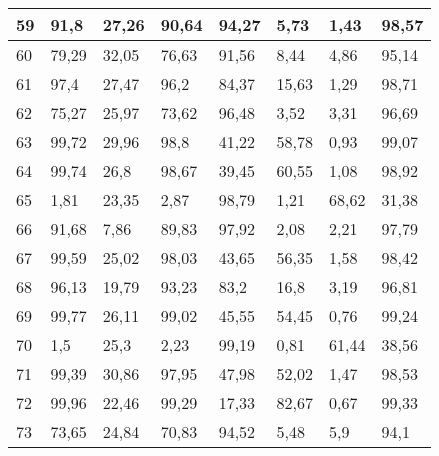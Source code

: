 \begin{longtable}[c]{|l|l|l|l|l|l|l|l|}
59              & 91,8         & 27,26        & 90,64       & 94,27         & 5,73          & 1,43          & 98,57         \\ \hline
60              & 79,29        & 32,05        & 76,63       & 91,56         & 8,44          & 4,86          & 95,14         \\ \hline
61              & 97,4         & 27,47        & 96,2        & 84,37         & 15,63         & 1,29          & 98,71         \\ \hline
62              & 75,27        & 25,97        & 73,62       & 96,48         & 3,52          & 3,31          & 96,69         \\ \hline
63              & 99,72        & 29,96        & 98,8        & 41,22         & 58,78         & 0,93          & 99,07         \\ \hline
64              & 99,74        & 26,8         & 98,67       & 39,45         & 60,55         & 1,08          & 98,92         \\ \hline
65              & 1,81         & 23,35        & 2,87        & 98,79         & 1,21          & 68,62         & 31,38         \\ \hline
66              & 91,68        & 7,86         & 89,83       & 97,92         & 2,08          & 2,21          & 97,79         \\ \hline
67              & 99,59        & 25,02        & 98,03       & 43,65         & 56,35         & 1,58          & 98,42         \\ \hline
68              & 96,13        & 19,79        & 93,23       & 83,2          & 16,8          & 3,19          & 96,81         \\ \hline
69              & 99,77        & 26,11        & 99,02       & 45,55         & 54,45         & 0,76          & 99,24         \\ \hline
70              & 1,5          & 25,3         & 2,23        & 99,19         & 0,81          & 61,44         & 38,56         \\ \hline
71              & 99,39        & 30,86        & 97,95       & 47,98         & 52,02         & 1,47          & 98,53         \\ \hline
72              & 99,96        & 22,46        & 99,29       & 17,33         & 82,67         & 0,67          & 99,33         \\ \hline
73              & 73,65        & 24,84        & 70,83       & 94,52         & 5,48          & 5,9           & 94,1          \\ \hline

\end{longtable}
